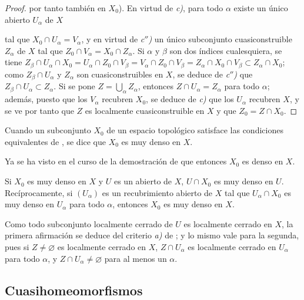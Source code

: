 \begin{proof}
por tanto también en $X_0$).
En virtud de \emph{c)}, para todo $\alpha$ existe un único abierto $U_\alpha$ de $X$


 tal que $X_0\cap U_\alpha=V_\alpha$, y en virtud de \emph{c$''$)} un único subconjunto cuasiconstruible $Z_\alpha$ de $X$ tal que $Z_0\cap V_\alpha=X_0\cap Z_\alpha$.
Si $\alpha$ y $\beta$ son dos índices cualesquiera, se tiene $Z_\beta\cap U_\alpha\cap X_0
=U_\alpha\cap Z_0\cap V_\beta
=V_\alpha\cap Z_0\cap V_\beta
=Z_\alpha\cap X_0\cap V_\beta
\subset Z_\alpha\cap X_0$; como $Z_\beta\cap U_\alpha$ y $Z_\alpha$ son cuasiconstruibles en $X$, se deduce de \emph{c$''$)} que $Z_\beta\cap U_\alpha\subset Z_\alpha$.
Si se pone $Z=\bigcup_\alpha Z_\alpha$, entonces $Z\cap U_\alpha=Z_\alpha$ para todo $\alpha$; además, puesto que los $V_\alpha$ recubren $X_0$, se deduce de \emph{c)} que los $U_\alpha$ recubren $X$, y se ve por tanto que $Z$ es localmente cuasiconstruible en $X$ y que $Z_0=Z\cap X_0$.
\end{proof}

\begin{definition}[10.1.3]
\label{IV.10.1.3}
Cuando un subconjunto $X_0$ de un espacio topológico satisface las condiciones equivalentes de , se dice que $X_0$ es muy denso en $X$.
\end{definition}

Ya se ha visto en el curso de la demostración de  que entonces $X_0$ es denso en $X$.

\begin{corollary}[10.1.4]
\label{IV.10.1.4}
Si $X_0$ es muy denso en $X$ y $U$ es un abierto de $X$, $U\cap X_0$ es muy denso en $U$.
Recíprocamente, si $(U_\alpha)$ es un recubrimiento abierto de $X$ tal que $U_\alpha\cap X_0$ es muy denso en $U_\alpha$ para todo $\alpha$, entonces $X_0$ es muy denso en $X$.
\end{corollary}

Como todo subconjunto localmente cerrado de $U$ es localmente cerrado en $X$, la primera afirmación se deduce del criterio \emph{a)} de ; y lo mismo vale para la segunda, pues si $Z\neq\varnothing$ es localmente cerrado en $X$, $Z\cap U_\alpha$ es localmente cerrado en $U_\alpha$ para todo $\alpha$, y $Z\cap U_\alpha\neq\varnothing$ para al menos un $\alpha$.

\subsection{Cuasihomeomorfismos}
\label{subsection:IV.10.2}

